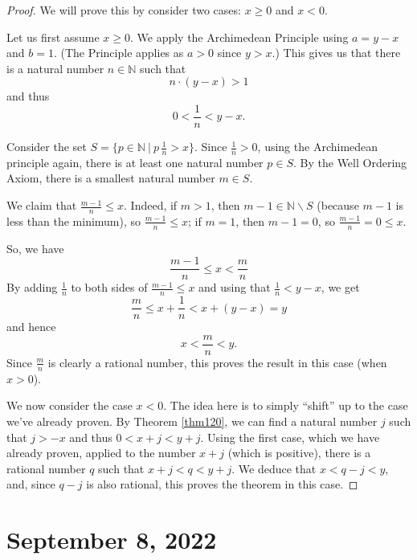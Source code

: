 \documentclass[12pt]{amsart}
\newcommand{\N}{\mathbb{N}}
\numberwithin{equation}{section}
\theoremstyle{plain} %
\newcommand{\Sept}[1]{\section{September #1, 2022}}
\theoremstyle{definition}
\theoremstyle{remark}
\begin{document}
\begin{proof} We will prove this by consider two cases: $x \geq 0$ and $x < 0$.

Let us first assume $x \geq 0$.
We apply the Archimedean Principle using $a = y-x$ and $b = 1$. (The Principle applies as
$a > 0$ since $y> x$.) This gives us that there is a natural number $n \in \N$ such that
$$
n \cdot (y-x) > 1
$$
and thus
$$
0 < \frac{1}{n} < y-x.
$$

Consider the set $S=\{p\in \N \ | \ p \, \frac{1}{n} >x \}$.
Since $\frac{1}{n} > 0$, using the Archimedean principle again, there is at least one natural number $p\in S$. By the Well Ordering Axiom, there is a smallest natural number $m\in S$. 

We claim that $\frac{m-1}{n} \leq x$. Indeed, if $m>1$, then $m-1\in \N \smallsetminus S$ (because $m-1$ is less than the minimum), so $\frac{m-1}{n}\leq x$; if $m=1$, then $m-1=0$, so $\frac{m-1}{n} = 0 \leq x$.

So, we have
$$
\frac{m-1}{n} \leq x< \frac{m}{n}
$$
By adding $\frac{1}{n}$ to both sides of $\frac{m-1}{n} \leq x$ and using that $\frac{1}{n} < y- x$, we get
$$
\frac{m}{n} \leq x + \frac{1}{n} < x + (y -x) = y
$$
and hence
$$
x < \frac{m}{n} < y.
$$
Since $\frac{m}{n}$ is clearly a rational number, this proves the result in this case (when $x > 0$). 

We now consider the case $x < 0$. The idea here is to simply ``shift'' up to the case we've already proven. 
By Theorem \ref{thm120}, we can find a natural number $j$ such that $j > -x$ and thus $0 < x +j < y +j$. Using the first case, which we have already proven,
applied 
to the number $x + j$ (which is positive), there is a rational number $q$ such that $x+j < q < y+j$. We deduce that $x < q-j < y$, and, since $q - j$ is also
rational, this proves the theorem in this case.
\end{proof}


\Sept{8}
\end{document}
